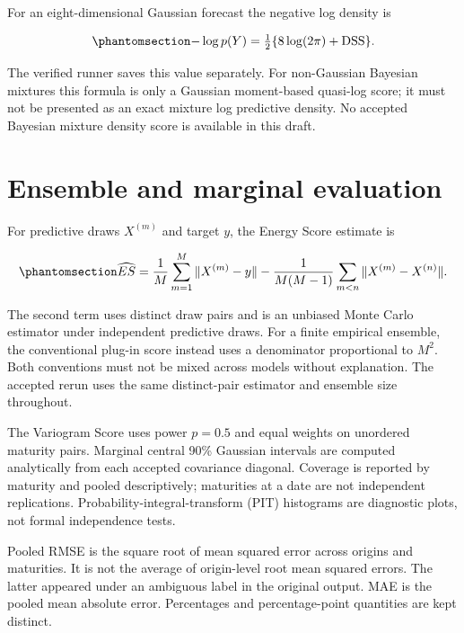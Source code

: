 \documentclass[
  12pt,
  letterpaper,
  DIV=11,
  numbers=noendperiod]{scrreprt}
\begin{document}
For an eight-dimensional Gaussian forecast the negative log density is

\begin{equation}\protect\phantomsection\label{eq-logscore}{
-\log p(Y)=\tfrac12\{8\log(2\pi)+\operatorname{DSS}\}.
}\end{equation}

The verified runner saves this value separately. For non-Gaussian
Bayesian mixtures this formula is only a Gaussian moment-based quasi-log
score; it must not be presented as an exact mixture log predictive
density. No accepted Bayesian mixture density score is available in this
draft.

\section{Ensemble and marginal
evaluation}\label{ensemble-and-marginal-evaluation}

For predictive draws \(X^{(m)}\) and target \(y\), the Energy Score
estimate is

\begin{equation}\protect\phantomsection\label{eq-energy}{
\widehat{ES}=\frac1M\sum_{m=1}^M\|X^{(m)}-y\|
-\frac{1}{M(M-1)}\sum_{m<n}\|X^{(m)}-X^{(n)}\|.
}\end{equation}

The second term uses distinct draw pairs and is an unbiased Monte Carlo
estimator under independent predictive draws. For a finite empirical
ensemble, the conventional plug-in score instead uses a denominator
proportional to \(M^2\). Both conventions must not be mixed across
models without explanation. The accepted rerun uses the same
distinct-pair estimator and ensemble size throughout.

The Variogram Score uses power \(p=0.5\) and equal weights on unordered
maturity pairs. Marginal central 90\% Gaussian intervals are computed
analytically from each accepted covariance diagonal. Coverage is
reported by maturity and pooled descriptively; maturities at a date are
not independent replications. Probability-integral-transform (PIT)
histograms are diagnostic plots, not formal independence tests.

Pooled RMSE is the square root of mean squared error across origins and
maturities. It is not the average of origin-level root mean squared
errors. The latter appeared under an ambiguous label in the original
output. MAE is the pooled mean absolute error. Percentages and
percentage-point quantities are kept distinct.
\end{document}
